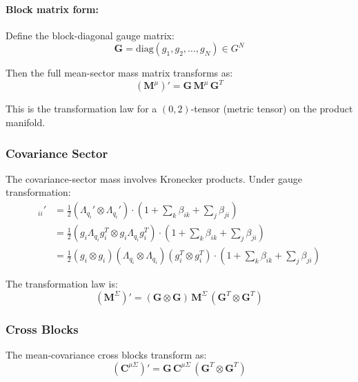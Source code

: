 \documentclass[12pt]{article}
\begin{document}
\paragraph{Block matrix form:}

Define the block-diagonal gauge matrix:
\begin{equation}
\mathbf{G} = \mathrm{diag}(g_1, g_2, \ldots, g_N) \in G^N
\end{equation}

Then the full mean-sector mass matrix transforms as:
\begin{equation}
\boxed{(\mathbf{M}^\mu)' = \mathbf{G} \, \mathbf{M}^\mu \, \mathbf{G}^T}
\end{equation}

This is the transformation law for a $(0,2)$-tensor (metric tensor) on the product manifold.

\subsubsection{Covariance Sector}

The covariance-sector mass involves Kronecker products. Under gauge transformation:
\begin{align}
[\mathbf{M}^\Sigma]_{ii}' &= \frac{1}{2}(\Lambda_{q_i}' \otimes \Lambda_{q_i}') \cdot \left(1 + \sum_k \beta_{ik} + \sum_j \beta_{ji}\right) \nonumber\\
&= \frac{1}{2}(g_i\Lambda_{q_i} g_i^T \otimes g_i\Lambda_{q_i} g_i^T) \cdot \left(1 + \sum_k \beta_{ik} + \sum_j \beta_{ji}\right) \nonumber\\
&= \frac{1}{2}(g_i \otimes g_i)(\Lambda_{q_i} \otimes \Lambda_{q_i})(g_i^T \otimes g_i^T) \cdot \left(1 + \sum_k \beta_{ik} + \sum_j \beta_{ji}\right)
\end{align}

The transformation law is:
\begin{equation}
\boxed{(\mathbf{M}^\Sigma)' = (\mathbf{G} \otimes \mathbf{G}) \, \mathbf{M}^\Sigma \, (\mathbf{G}^T \otimes \mathbf{G}^T)}
\end{equation}

\subsubsection{Cross Blocks}

The mean-covariance cross blocks transform as:
\begin{equation}
(\mathbf{C}^{\mu\Sigma})' = \mathbf{G} \, \mathbf{C}^{\mu\Sigma} \, (\mathbf{G}^T \otimes \mathbf{G}^T)
\end{equation}
\end{document}
